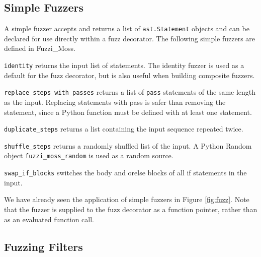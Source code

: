 \documentclass{sig-alternate}
\newenvironment{FunctionList}{%
\lstset{basicstyle=\ttfamily\bfseries\small}
\begin{list}{}{\leftmargin=5pt}
}{\end{list}\lstset{basicstyle=\ttfamily\small}}
\begin{document}

\subsection{Simple Fuzzers}


A simple fuzzer accepts and returns a list of \lstinline!ast.Statement! objects
and can be declared for use directly within a fuzz decorator.  The following
simple fuzzers are defined in Fuzzi\_Moss.

\begin{FunctionList}

\item\lstinline!identity! returns the input list of statements.  The identity
  fuzzer is used as a default for the fuzz decorator, but is also useful when
  building composite fuzzers.

\item\lstinline!replace_steps_with_passes! returns a list of \lstinline!pass!
  statements of the same length as the input.  Replacing statements with pass is
  safer than removing the statement, since a Python function must be defined
  with at least one statement.

\item\lstinline!duplicate_steps! returns a list containing the input sequence
  repeated twice.

\item\lstinline!shuffle_steps! returns a randomly shuffled list of the input.  A
  Python Random object \lstinline!fuzzi_moss_random! is used as a random source.

\item \lstinline!swap_if_blocks! switches the body and orelse blocks of all if
  statements in the input.

\end{FunctionList}

We have already seen the application of simple fuzzers in Figure \ref{fig:fuzz}.
Note that the fuzzer is supplied to the fuzz decorator as a function pointer,
rather than as an evaluated function call.


\subsection{Fuzzing Filters}
\end{document}
